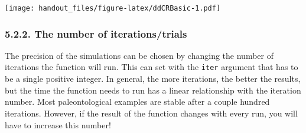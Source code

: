 \documentclass[]{article}
\begin{document}
\texttt{[image: handout\_files/figure-latex/ddCRBasic-1.pdf]}

\hypertarget{the-number-of-iterationstrials}{%
\subsubsection{5.2.2. The number of
iterations/trials}\label{the-number-of-iterationstrials}}

The precision of the simulations can be chosen by changing the number of
iterations the function will run. This can set with the \texttt{iter}
argument that has to be a single positive integer. In general, the more
iterations, the better the results, but the time the function needs to
run has a linear relationship with the iteration number. Most
paleontological examples are stable after a couple hundred iterations.
However, if the result of the function changes with every run, you will
have to increase this number!
\end{document}
